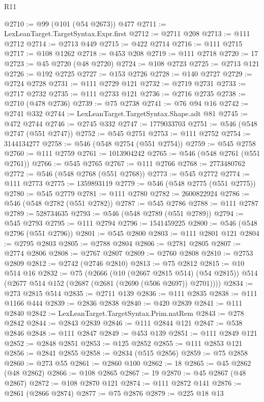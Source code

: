 \begin{lexlean}{R11}
\begin{coremodule}
@2710 := @99 (@101 (@54 @2673)) @477
@2711 := LexLeanTarget.TargetSyntax.Expr.first
@2712 := @2711 @208
@2713 := @111 @2712
@2714 := @2713 @449
@2715 := @422 @2714
@2716 := @111 @2715
@2717 := @108 @1262
@2718 := @453 @208
@2719 := @111 @2718
@2720 := 17
@2723 := @45 @2720 (@48 @2720)
@2724 := @108 @2723
@2725 := @2713 @121
@2726 := @192 @2725
@2727 := @153 @2726
@2728 := @140 @2727
@2729 := @2724 @2728
@2731 := @111 @2729 @121
@2732 := @2719 @2731
@2733 := @2717 @2732
@2735 := @111 @2733 @121
@2736 := @2716 @2735
@2738 := @2710 (@478 @2736)
@2739 := @75 @2738
@2741 := @76 @94 @16
@2742 := @2741 @332
@2744 := LexLeanTarget.TargetSyntax.Shape.adt @81
@2745 := @472 @2744
@2746 := @2745 @332
@2747 := 1779033703
@2751 := @546 (@548 @2747 (@551 @2747))
@2752 := @545 @2751
@2753 := @111 @2752
@2754 := 3144134277
@2758 := @546 (@548 @2754 (@551 @2754))
@2759 := @545 @2758
@2760 := @111 @2759
@2761 := 1013904242
@2765 := @546 (@548 @2761 (@551 @2761))
@2766 := @545 @2765
@2767 := @111 @2766
@2768 := 2773480762
@2772 := @546 (@548 @2768 (@551 @2768))
@2773 := @545 @2772
@2774 := @111 @2773
@2775 := 1359893119
@2779 := @546 (@548 @2775 (@551 @2775))
@2780 := @545 @2779
@2781 := @111 @2780
@2782 := 2600822924
@2786 := @546 (@548 @2782 (@551 @2782))
@2787 := @545 @2786
@2788 := @111 @2787
@2789 := 528734635
@2793 := @546 (@548 @2789 (@551 @2789))
@2794 := @545 @2793
@2795 := @111 @2794
@2796 := 1541459225
@2800 := @546 (@548 @2796 (@551 @2796))
@2801 := @545 @2800
@2803 := @111 @2801 @121
@2804 := @2795 @2803
@2805 := @2788 @2804
@2806 := @2781 @2805
@2807 := @2774 @2806
@2808 := @2767 @2807
@2809 := @2760 @2808
@2810 := @2753 @2809
@2812 := @2742 (@2746 @2810)
@2813 := @75 @2812
@2815 := @10 @514 @16
@2832 := @75
    (@2666
      (@10 (@2667 @2815 @514) (@54 @2815))
      @514
      (@2677 @514 @152 (@2687 (@2681 (@2690 (@506 @2697)) @2701))))
@2834 := @273 @2815 @514
@2835 := @2711 @139
@2836 := @111 @2835
@2838 := @111 @1166 @444
@2839 := @2836 @2838
@2840 := @420 @2839
@2841 := @111 @2840
@2842 := LexLeanTarget.TargetSyntax.Prim.natRem
@2843 := @278 @2842
@2844 := @2843 @2839
@2846 := @111 @2844 @121
@2847 := @538 @2846
@2848 := @111 @2847
@2849 := @453 @139
@2851 := @111 @2849 @121
@2852 := @2848 @2851
@2853 := @125 @2852
@2855 := @111 @2853 @121
@2856 := @2841 @2855
@2858 := @2834 (@515 @2856)
@2859 := @75 @2858
@2860 := @273 @55
@2861 := @2860 @100
@2862 := 18
@2865 := @45 @2862 (@48 @2862)
@2866 := @108 @2865
@2867 := 19
@2870 := @45 @2867 (@48 @2867)
@2872 := @108 @2870 @121
@2874 := @111 @2872 @141
@2876 := @2861 (@2866 @2874)
@2877 := @75 @2876
@2879 := @225 @18 @13

\end{coremodule}
\end{lexlean}
